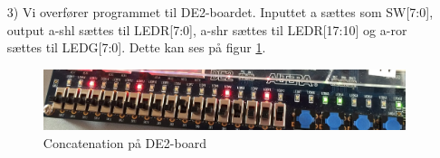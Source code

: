 \begin{enumerate}
	
	\item[3)]
Vi overfører programmet til DE2-boardet. Inputtet a sættes som SW[7:0], output a-shl sættes til LEDR[7:0], a-shr sættes til LEDR[17:10] og a-ror sættes til LEDG[7:0]. Dette kan ses på figur \ref{fig:concatenation_DE2board}.

	\begin{figure}[H]
		\centering
		\includegraphics[scale=0.23]{pictures/Oevelse3/Concatenation_DE2board.jpg}
		\caption{Concatenation på DE2-board}
		\label{fig:concatenation_DE2board}
	\end{figure}

\end{enumerate}
\pagebreak